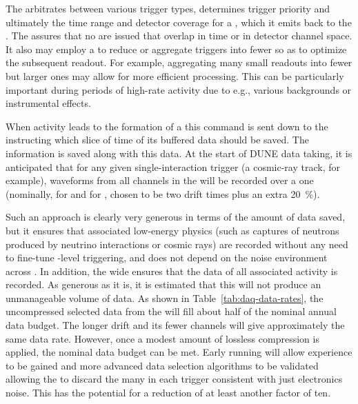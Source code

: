 The  arbitrates between various trigger types, determines
trigger priority and ultimately the time range and detector coverage
for a , which it emits back to the .
The  assures that no  are issued that 
overlap in time or in detector channel space.
It also may employ a  to reduce or aggregate triggers into
fewer  so as to optimize the subsequent readout. 
For example, aggregating many small readouts into fewer but larger
ones may allow for more efficient processing.   This can be particularly
important during periods of high-rate activity due to e.g., various
backgrounds or instrumental effects.

When activity leads to the formation of a  this
command is sent down to the  instructing which slice of
time of its buffered data should be saved. 
The  information is saved along with this data. 
At the start of DUNE data taking, it is anticipated that for any given
single-interaction trigger (a cosmic-ray track, for example), waveforms
from all channels in the  will be recorded over a one
 (nominally, \spreadout for  and
\dpreadout for , chosen to be two drift times  plus an
extra \SI{20}{\%}). 

Such an approach is clearly very generous in terms of the amount of
data saved, but it ensures that associated low-energy physics (such as
captures of neutrons produced by neutrino interactions or cosmic rays)
are recorded without any need to fine-tune -level
triggering, and does not depend on the noise environment across
. 
In addition, the wide  ensures that the data of
all associated activity is recorded.
As generous as it is, it is estimated that this 
will not produce an unmanageable volume of data.
As shown in Table~\ref{tab:daq-data-rates}, the uncompressed selected
data from the  will fill about half of the
nominal annual data budget. 
The longer \dual drift and its fewer channels will give approximately the
same data rate. 
However, once a modest amount of lossless compression is applied, the
nominal data budget can be met. 
Early running will allow experience to be gained and more advanced
data selection algorithms to be validated allowing the  to discard
the many  in each trigger consistent
with just electronics noise. 
This has the potential for a reduction of at least another factor of ten.

